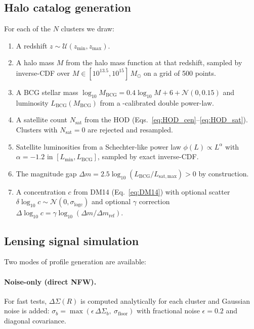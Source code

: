 \documentclass[12pt,a4paper]{article}
\begin{document}
\subsection{Halo catalog generation}

For each of the $N$ clusters we draw:
\begin{enumerate}
  \item A redshift $z \sim \mathcal{U}(z_\mathrm{min}, z_\mathrm{max})$.
  \item A halo mass $M$ from the \citet{Tinker2008} halo mass function at that redshift,
    sampled by inverse-CDF over $M\in[10^{13.5}, 10^{15}]\,M_\odot$ on a grid of 500 points.
  \item A BCG stellar mass $\log_{10}M_\mathrm{BCG} = 0.4\log_{10}M + 6 + \mathcal{N}(0, 0.15)$
    and luminosity $L_\mathrm{BCG}(M_\mathrm{BCG})$ from a \citet{Zheng2007}-calibrated
    double power-law.
  \item A satellite count $N_\mathrm{sat}$ from the HOD (Eqs.~\ref{eq:HOD_cen}--\ref{eq:HOD_sat}).
    Clusters with $N_\mathrm{sat}=0$ are rejected and resampled.
  \item Satellite luminosities from a Schechter-like power law
    $\phi(L)\propto L^\alpha$ with $\alpha=-1.2$ in
    $[L_\mathrm{min}, L_\mathrm{BCG}]$, sampled by exact inverse-CDF.
  \item The magnitude gap
    $\Delta m = 2.5\log_{10}(L_\mathrm{BCG}/L_\mathrm{sat,max}) > 0$ by construction.
  \item A concentration $c$ from DM14 (Eq.~\ref{eq:DM14}) with optional scatter
    $\delta\log_{10}c \sim \mathcal{N}(0, \sigma_\mathrm{logc})$ and optional
    $\gamma$ correction $\Delta\log_{10}c = \gamma\log_{10}(\Delta m/\Delta m_\mathrm{ref})$.
\end{enumerate}

\subsection{Lensing signal simulation}

Two modes of profile generation are available:

\paragraph{Noise-only (direct NFW).}
For fast tests, $\Delta\Sigma(R)$ is computed analytically for each cluster and
Gaussian noise is added:
$\sigma_b = \max(\epsilon\,\Delta\Sigma_b,\ \sigma_\mathrm{floor})$
with fractional noise $\epsilon=0.2$ and diagonal covariance.
\end{document}
